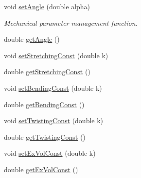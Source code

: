 \begin{DoxyCompactItemize}
\item 
void \hyperlink{classMCylinder_ab49ff16095c669f3a3dc4866597c13e7}{set\+Angle} (double alpha)
\begin{DoxyCompactList}\small\item\em Mechanical parameter management function. \end{DoxyCompactList}\item 
double \hyperlink{classMCylinder_aaf9f88afc648aa965028f64163c8d336}{get\+Angle} ()
\item 
void \hyperlink{classMCylinder_af9a3d6741a8cf7b72d983d0b25446092}{set\+Stretching\+Const} (double k)
\item 
double \hyperlink{classMCylinder_a46afbfa5fa8050dee247c1a91b9bd2d6}{get\+Stretching\+Const} ()
\item 
void \hyperlink{classMCylinder_a441c75cb7dcafe33de0dcb04ac839eb9}{set\+Bending\+Const} (double k)
\item 
double \hyperlink{classMCylinder_aab0e5ecedb045b81c1bb0d42bbe1c55a}{get\+Bending\+Const} ()
\item 
void \hyperlink{classMCylinder_ae68ccc14047ef0ece414e967dd7364f4}{set\+Twisting\+Const} (double k)
\item 
double \hyperlink{classMCylinder_aa15887dd8d78c56f00236b2776b79f8b}{get\+Twisting\+Const} ()
\item 
void \hyperlink{classMCylinder_aad7533f1b024044574d17c9e681772a9}{set\+Ex\+Vol\+Const} (double k)
\item 
double \hyperlink{classMCylinder_aafd38200ff997912fae0c1ec8c2140dd}{get\+Ex\+Vol\+Const} ()
\end{DoxyCompactItemize}

